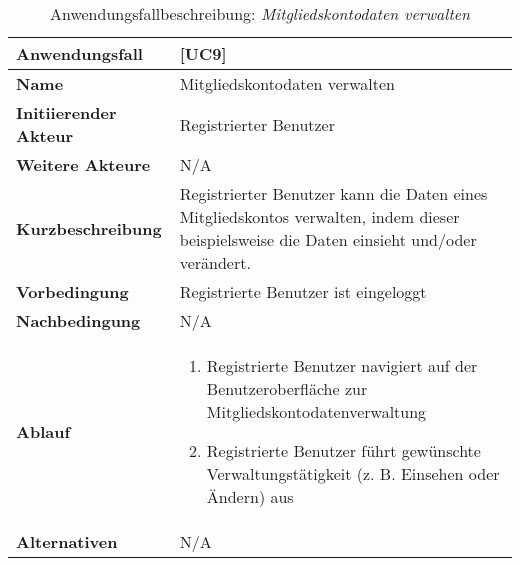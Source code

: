 \begin{table} [H]
    \centering
    \caption{Anwendungsfallbeschreibung: \emph{Mitgliedskontodaten verwalten}}
    \begin{tabularx}{\textwidth}{|l|X|}
        \toprule
        \textbf{Anwendungsfall}           & [UC9]                                                                                                                                     \\
        \hline
        \textbf{Name}                     & Mitgliedskontodaten verwalten                                                                                                             \\
        \hline
        \textbf{Initiierender Akteur}     & Registrierter Benutzer                                                                                                                    \\
        \hline
        \textbf{Weitere Akteure}          & N/A                                                                                                                                       \\
        \hline
        \textbf{Kurzbeschreibung}         & Registrierter Benutzer kann die Daten eines Mitgliedskontos verwalten, indem dieser beispielsweise die Daten einsieht und/oder verändert. \\
        \hline
        \textbf{Vorbedingung}             & Registrierte Benutzer ist eingeloggt                                                                                                      \\
        \hline
        \textbf{Nachbedingung}            & N/A                                                                                                                                       \\
        \hline
        \textbf{Ablauf} & \begin{enumerate}
                              \item Registrierte Benutzer navigiert auf der Benutzeroberfläche zur Mitgliedskontodatenverwaltung
                              \item Registrierte Benutzer führt gewünschte Verwaltungstätigkeit (z. B. Einsehen oder Ändern) aus
        \end{enumerate} \\
        \hline
        \textbf{Alternativen}             & N/A                                                                                                                                       \\

\end{tabularx}
\end{table}
